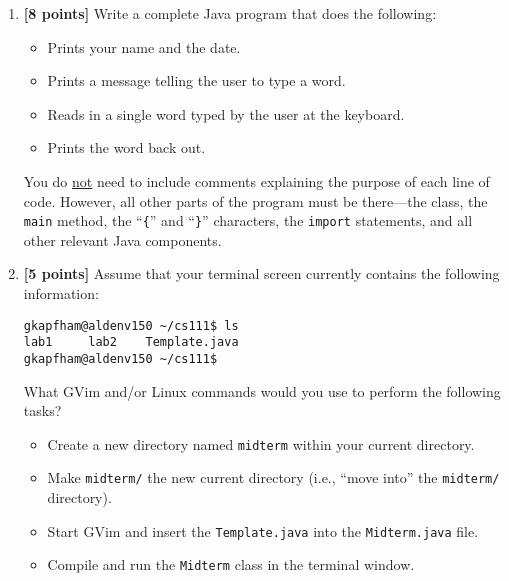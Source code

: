\documentclass[11pt]{report}
\begin{document}
\begin{enumerate}


\item {\bf [8 points]}
Write a complete Java program that does the following: 
\begin{itemize}
\setlength{\itemsep}{0pt}
\item Prints your name and the date. 
\item Prints a message telling the user to type a word. 
\item Reads in a single word typed by the user at the keyboard. 
\item Prints the word back out. 
\end{itemize}
You do \underline{not} need to include 
comments explaining the purpose of each line of code.
However, all other parts of the program must be
there---the class, the {\tt main} method, the ``{\tt \{}'' and ``{\tt \}}'' characters,
the {\tt import} statements, and all other relevant Java components.


\vspace{1.5in}

\item {\bf [5 points]}
Assume that your terminal screen currently contains the following information:
\begin{center}
\begin{minipage}{3in}
\begin{verbatim}
gkapfham@aldenv150 ~/cs111$ ls
lab1     lab2    Template.java
gkapfham@aldenv150 ~/cs111$ 
\end{verbatim}
\end{minipage}
\end{center}

What GVim and/or Linux commands would you use to perform the following tasks? 
\begin{itemize}
\setlength{\itemsep}{0pt}
\item Create a new directory named {\tt midterm} within your current directory.
\item Make {\tt midterm/} the new current directory (i.e., ``move into'' the {\tt midterm/} directory).
\item Start GVim and insert the {\tt Template.java} into the {\tt Midterm.java} file.
\item Compile and run the {\tt Midterm} class in the terminal window.
\end{itemize}


\end{enumerate}
\end{document}
